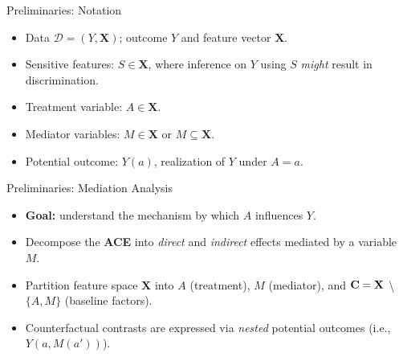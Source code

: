 \documentclass[12pt,t]{beamer}
\newcommand{\D}{\mathcal{D}}
\begin{document}

\begin{frame}[c]{Preliminaries: Notation}

\begin{center}
\begin{itemize}
  \itemsep10pt
  \item Data $\D = (Y, \bm{X})$; outcome $Y$ and feature vector $\bm{X}$.
  \item Sensitive features: $S \in \bm{X}$, where inference on $Y$ using $S$
    \textit{might} result in discrimination.
  \item Treatment variable: $A \in \bm{X}$.
  \item Mediator variables: $M \in \bm{X}$ or $M \subseteq \bm{X}$.
  \item Potential outcome: $Y(a)$, realization of $Y$ under $A = a$.
\end{itemize}
\end{center}


\end{frame}


\begin{frame}[c]{Preliminaries: Mediation Analysis}

\begin{center}
\begin{itemize}
  \itemsep10pt
  \item \textbf{Goal:} understand the mechanism by which $A$ influences $Y$.
  \item Decompose the \textbf{ACE} into \textit{direct} and \textit{indirect}
    effects mediated by a variable $M$.
  \item Partition feature space $\bm{X}$ into $A$ (treatment), $M$ (mediator),
    and $\bf{C} = \bm{X}$ \textbackslash \hspace{0.05em} $\{A, M\}$ (baseline
    factors).
  \item Counterfactual contrasts are expressed via \textit{nested} potential
    outcomes (i.e., $Y(a, M(a'))$).
\end{itemize}
\end{center}


\end{frame}
\end{document}

